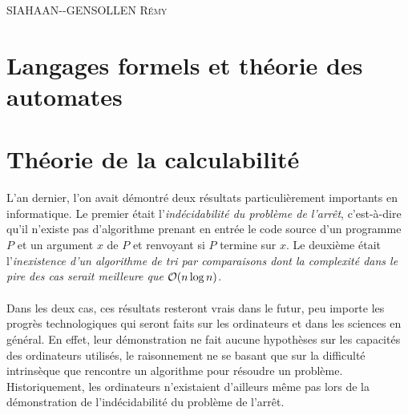 \documentclass[a4paper,french,bookmarks]{book}
\begin{document}
    \hfill{\textsc{SIAHAAN-{}-GENSOLLEN Rémy}}
    
    \pagestyle{intro}
    

    \dominitoc\nomtcrule 
    {\sffamily\tableofcontents}\mtcaddchapter\pagestyle{toc}
    
    
    
    \pagestyle{plain}
    
    
%    
    
    \chapter{Langages formels et théorie des automates}
    
    
    
    \chapter{Théorie de la calculabilité}
    
    L'an dernier, l'on avait démontré deux résultats particulièrement importants en informatique. Le premier était l'\emph{indécidabilité du problème de l'arrêt}, c'est-à-dire qu'il n'existe pas d'algorithme prenant en entrée le code source d'un programme $P$ et un argument $x$ de $P$ et renvoyant si $P$ termine sur $x$. Le deuxième était l'\emph{inexistence d'un algorithme de tri par comparaisons dont la complexité dans le pire des cas serait meilleure que $\O{}{n\log n}$}.\medskip
    
    Dans les deux cas, ces résultats resteront vrais dans le futur, peu importe les progrès technologiques qui seront faits sur les ordinateurs et dans les sciences en général. En effet, leur démonstration ne fait aucune hypothèses sur les capacités des ordinateurs utilisés, le raisonnement ne se basant que sur la difficulté intrinsèque que rencontre un algorithme pour résoudre un problème. Historiquement, les ordinateurs n'existaient d'ailleurs même pas lors de la démonstration de l'indécidabilité du problème de l'arrêt.\medskip
    
\end{document}
